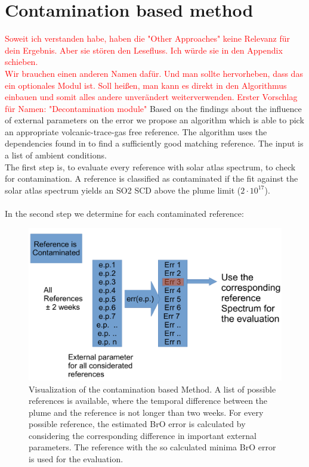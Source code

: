 \documentclass  [
  paper    = a4,
  BCOR     = 10mm,
  twoside,
  fontsize = 12pt,
  fleqn,
  toc      = bibnumbered,
  toc      = listofnumbered,
  numbers  = noendperiod,
  headings = normal,
  listof   = leveldown,
  version  = 3.03
]                                       {scrreprt}
\begin{document}
\chapter{Contamination based method \label{chapt:contbased}}
\textcolor{red}{Soweit ich verstanden habe, haben die "Other Approaches" keine Relevanz für dein Ergebnis. Aber sie stören den Lesefluss. Ich würde sie in den Appendix schieben.}\\
\textcolor{red}{Wir brauchen einen anderen Namen dafür. Und man sollte hervorheben, dass das ein optionales Modul ist. Soll heißen, man kann es direkt in den Algorithmus einbauen und somit alles andere unverändert weiterverwenden. Erster Vorschlag für Namen: "Decontamination module"}
	Based on the findings about the influence of external parameters on the  error we propose an algorithm which is able to pick an appropriate volcanic-trace-gas free reference. The algorithm uses the dependencies found in  to find a sufficiently good matching reference. The input is a list of ambient conditions.\\ 
	The first step is, to evaluate every reference with solar atlas spectrum, to check for contamination. A reference is classified as contaminated if the fit against the solar atlas spectrum yields an SO2 SCD above the plume limit ($2\cdot 10^{17}$).\\
	\\
	In the second step we determine for each contaminated reference:
	\begin{figure}
		\centering
		\includegraphics[width=0.7\linewidth]{Bilder/Cont}
		\caption{Visualization of the contamination based Method. A list of possible references is available, where the temporal difference between the plume and the reference is not longer than two weeks. For every possible reference, the estimated BrO error is calculated by considering the corresponding difference in important external parameters. The reference with the so calculated minima BrO error is used for the evaluation.}
		\label{fig:Cont}
	\end{figure}
\end{document}
